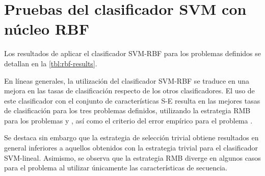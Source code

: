 \section{Pruebas del clasificador SVM con núcleo RBF}
Los resultados de aplicar el clasificador SVM-RBF para los problemas
definidos se detallan en la \autoref{tbl:rbf-results}.

En líneas generales, la utilización del clasificador SVM-RBF se
traduce en una mejora en las tasas de clasificación respecto de los
otros clasificadores.
El uso de este clasificador con el conjunto de características S-E
resulta en las mejores tasas de clasificación para los tres problemas
definidos, utilizando la estrategia RMB para los problemas
\tripletsvm{} y \micropred{}, así como el criterio del error empírico
para el problema \mipred{}.

Se destaca sin embargo que la estrategia de selección trivial obtiene
resultados en general inferiores a aquellos obtenidos con la
estrategia trivial para el clasificador SVM-lineal. Asimismo, se
observa que la estrategia RMB diverge en algunos casos para el
problema \mipred{} al utilizar únicamente las características de
secuencia.